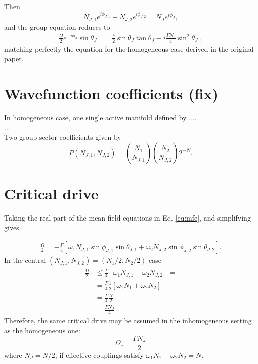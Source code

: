 \documentclass[11pt]{article}
\begin{document}
Then
\begin{equation}
N_{J,1}e^{i\phi_{J,1}}
+
N_{J,2}e^{i\phi_{J,2}}
=
N_J e^{i\phi_J},
\end{equation}
and the group equation reduces to
\begin{equation}
\begin{aligned}
\frac{\Omega}{2}
e^{-i\phi_J}
\sin\theta_J
=
&\frac{\delta}{2}
\sin \theta_J \tan \theta_J
-
i\frac{\Gamma N_J}{4}
\sin^2\theta_J.,
\end{aligned}
\end{equation}
matching perfectly the equation for the homogeneous case derived in the original paper. 

\section{Wavefunction coefficients (fix)}
In homogeneous case, one single active manifold defined by  ....
\\
...
\\

Two-group sector coefficients given by
\begin{equation}
P(N_{J,1},N_{J,2})
=
\binom{N_1}{N_{J,1}}
\binom{N_2}{N_{J,2}}
2^{-N}.
\end{equation}


\section{Critical drive}

Taking the real part of the mean field equations in Eq. \ref{eq:mfe}, and simplifying gives

\begin{equation}
\begin{aligned}
\frac{\Omega}{2}
=
-\frac{\Gamma}{4}
\left[
\omega_1 N_{J,1} \sin \phi_{J,1} \sin\theta_{J,1}
+
\omega_2 N_{J,2} \sin \phi_{J,2} \sin\theta_{J,2}
\right].
\end{aligned}
\end{equation}
In the central $(N_{J,1}, N_{J,2}) = (N_1/2,N_2/2)$ case
\begin{equation}
\begin{aligned}
\frac{\Omega}{2}
& \leq
\frac{\Gamma}{4}
\left[
\omega_1 N_{J,1}
+
\omega_2 N_{J,2} 
\right] =
\\
& = \frac{\Gamma}{4} \frac{1}{2} \left[ \omega_1 N_1 + \omega_2 N_2 \right]
\\
& = \frac{\Gamma}{4} \frac{N}{2}
\\
& = \frac{\Gamma N_J}{4}
\end{aligned}
\end{equation}
Therefore, the same critical drive may be assumed in the inhomogeneous setting as the homogeneous one:
\begin{equation}
    \Omega_c = \frac{\Gamma N_J}{2}
\end{equation}
where $N_J = N/2$, if effective couplings satisfy $\omega_1 N_1 + \omega_2 N_2 = N$.
\end{document}
